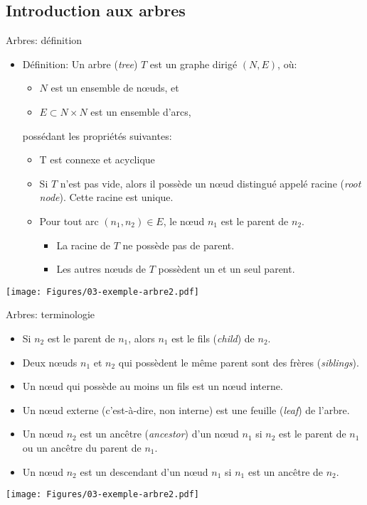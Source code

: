 \subsection{Introduction aux arbres}

\begin{frame}{Arbres: définition}
\begin{itemize}
\item Définition: Un arbre (\emph{tree}) $T$ est un graphe dirigé $(N,E)$, où:
\begin{itemize}
\item $N$ est un ensemble de n\oe uds, et
\item $E\subset N\times N$ est un ensemble d'arcs,
\end{itemize}
possédant les propriétés suivantes:
\begin{itemize}
\item T est connexe et acyclique
\item Si $T$ n'est pas vide, alors il possède un n\oe ud distingué appelé racine (\emph{root node}). Cette racine est unique.
\item Pour tout arc $(n_1,n_2)\in E$, le n\oe ud $n_1$ est le \alert{parent} de $n_2$.
\begin{itemize}
\item La racine de $T$ ne possède pas de parent.
\item Les autres n\oe uds de $T$ possèdent un et un seul parent.
\end{itemize}
\end{itemize}
\end{itemize}

\centerline{\texttt{[image: Figures/03-exemple-arbre2.pdf]}}

\end{frame}

\begin{frame}{Arbres: terminologie}
\begin{itemize}
\item Si $n_2$ est le parent de $n_1$, alors $n_1$ est le \alert{fils} (\emph{child}) de $n_2$.
\item Deux n\oe uds $n_1$ et $n_2$ qui possèdent le même parent sont
  des \alert{frères} (\emph{siblings}).
\item Un n\oe ud qui possède au moins un fils est un n\oe ud \alert{interne}.
\item Un n\oe ud externe (c'est-à-dire, non interne) est une \alert{feuille}
  (\emph{leaf}) de l'arbre.
\item Un n\oe ud $n_2$ est un \alert{ancêtre} (\emph{ancestor}) d'un n\oe ud
  $n_1$ si $n_2$ est le parent de $n_1$ ou un ancêtre du parent de $n_1$.
\item Un n\oe ud $n_2$ est un \alert{descendant} d'un n\oe ud $n_1$ si $n_1$ est un ancêtre de $n_2$.
\end{itemize}

\centerline{\texttt{[image: Figures/03-exemple-arbre2.pdf]}}

\end{frame}

